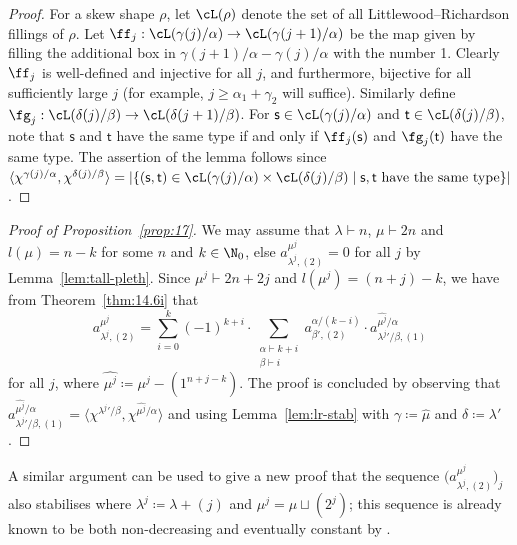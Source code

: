 \begin{proof}
	For a skew shape $\rho$, let $\cL(\rho)$ denote the set of all Littlewood--Richardson fillings of $\rho$. Let $\ff_j:\cL(\gamma(j)/\alpha)\to \cL(\gamma(j+1)/\alpha)$ be the map given by filling the additional box in $\gamma(j+1)/\alpha - \gamma(j)/\alpha$ with the number 1. Clearly $\ff_j$ is well-defined and injective for all $j$, and furthermore, bijective for all sufficiently large $j$ (for example, $j\ge \alpha_1+\gamma_2$ will suffice).
	Similarly define $\fg_j:\cL(\delta(j)/\beta)\to\cL(\delta(j+1)/\beta)$. For $\mathsf{s}\in\cL(\gamma(j)/\alpha)$ and $\mathsf{t}\in\cL(\delta(j)/\beta)$, note that $\mathsf{s}$ and $\mathsf{t}$ have the same type if and only if $\ff_j(\mathsf{s})$ and $\fg_j(\mathsf{t})$ have the same type. The assertion of the lemma follows since $\langle\chi^{\gamma(j)/\alpha},\chi^{\delta(j)/\beta}\rangle = |\{(\mathsf{s},\mathsf{t})\in\cL(\gamma(j)/\alpha)\times\cL(\delta(j)/\beta) \mid \mathsf{s}, \mathsf{t}\text{ have the same type} \}|$.
\end{proof}

\begin{proof}[Proof of Proposition~\ref{prop:17}]
	We may assume that $\lambda\vdash n$, $\mu\vdash 2n$ and $l(\mu)=n-k$ for some $n$ and $k\in\N_0$, else $a^{\mu^j}_{\lambda^j,(2)}=0$ for all $j$ by Lemma~\ref{lem:tall-pleth}. Since $\mu^j\vdash 2n+2j$ and $l(\mu^j)=(n+j)-k$, we have from Theorem~\ref{thm:14.6i} that
	\[ a^{\mu^j}_{\lambda^j,(2)} = \sum_{i=0}^k (-1)^{k+i}\cdot \sum_{\substack{\alpha\vdash k+i\\\beta\vdash i}} a^{\alpha/(k-i)}_{\beta',(2)}\cdot a^{\hat{\mu^j}/\alpha}_{{\lambda^j}'/\beta,(1)} \]
	for all $j$, where $\hat{\mu^j}\coloneqq \mu^j-(1^{n+j-k})$. The proof is concluded by observing that $a^{\hat{\mu^j}/\alpha}_{{\lambda^j}'/\beta,(1)}=\langle \chi^{{\lambda^j}'/\beta},\chi^{\hat{\mu^j}/\alpha}\rangle$ and using Lemma~\ref{lem:lr-stab} with $\gamma\coloneqq \hat{\mu}$ and $\delta\coloneqq \lambda'$.
\end{proof}

\begin{remark}
	A similar argument can be used to give a new proof that the sequence $\big(a^{\mu^j}_{\lambda^j,(2)}\big)_j$ also stabilises where $\lambda^j\coloneqq \lambda+(j)$ and $\mu^j=\mu\sqcup(2^j)$; this sequence is already known to be both non-decreasing and eventually constant by \cite[ Corollary 1]{Brion}.%
\end{remark}



